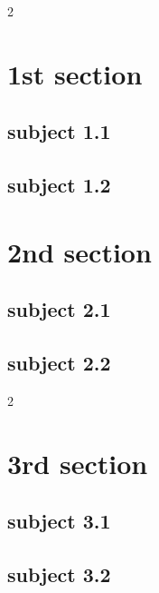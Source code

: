 \documentclass[10pt,a4paper, draft]{article}
\begin{document}
    \begin{paracol}{2}

        \section*{1st section}

        \subsection*{subject 1.1}
          

        \subsection*{subject 1.2}
        \lipsum[2]

    \switchcolumn

        \section*{2nd section}

        \subsection*{subject 2.1}
        \lipsum[2]

        \subsection*{subject 2.2}
        \lipsum[1]

    \end{paracol}
    \newpage
    \begin{paracol}{2}

        \section*{3rd section}

        \subsection*{subject 3.1}
        \lipsum[2]

        \subsection*{subject 3.2}
        \lipsum[1]

    \end{paracol}
\end{document}
